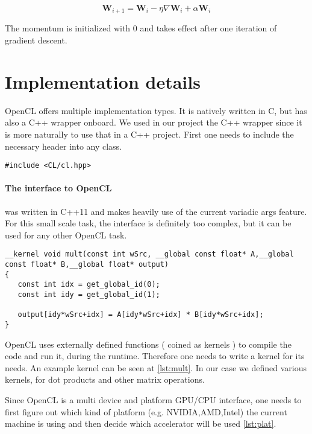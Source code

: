 \begin{equation}
\mathbf{W}_{i+1} = \mathbf{W}_i - \eta \nabla \mathbf{W}_i + \alpha \mathbf{W}_i
\end{equation}

The momentum is initialized with 0 and takes effect after one iteration of gradient descent.

\section{Implementation details}

OpenCL offers multiple implementation types. It is natively written in C, but has also a C++ wrapper onboard. We used in our project the C++ wrapper since it is more naturally to use that in a C++ project.
First one needs to include the necessary header into any class.

\begin{lstlisting}[caption=OpenCL C++ header]
#include <CL/cl.hpp>
\end{lstlisting}


\paragraph{The interface to OpenCL} was written in C++11 and makes heavily use of the current variadic args feature. For this small scale task, the interface is definitely too complex, but it can be used for any other OpenCL task.

\label{lst:mult}
\begin{lstlisting}[caption=Example Kernel function]
__kernel void mult(const int wSrc, __global const float* A,__global const float* B,__global float* output)
{
   const int idx = get_global_id(0);
   const int idy = get_global_id(1);

   output[idy*wSrc+idx] = A[idy*wSrc+idx] * B[idy*wSrc+idx];
}
\end{lstlisting}
OpenCL uses externally defined functions ( coined as kernels ) to compile the code and run it, during the runtime. Therefore one needs to write a kernel for its needs. An example kernel can be seen at \ref{lst:mult}. In our case we defined various kernels, for dot products and other matrix operations.

Since OpenCL is a multi device and platform GPU/CPU interface, one needs to first figure out which kind of platform (e.g. NVIDIA,AMD,Intel) the current machine is using and then decide which accelerator will be used \ref{lst:plat}.

